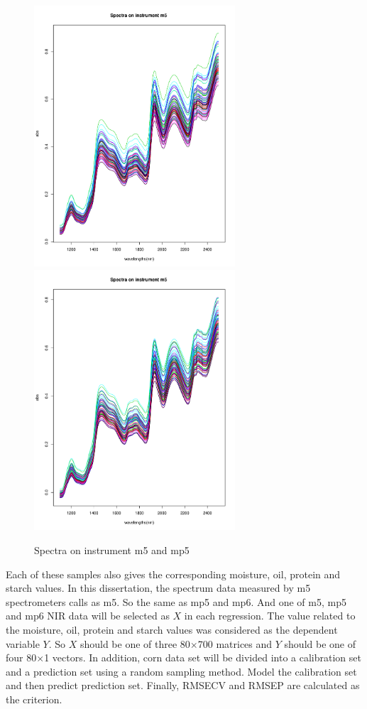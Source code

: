 \documentclass[a4paper,12pt,titlepage]{article} %
\numberwithin{equation}{section}  %
\begin{document}
		\begin{figure}[h]    %
		\centering           %
		\includegraphics[width=7.5cm, angle=0]{Spectra_on_instrument_m5.pdf}  %
				\includegraphics[width=7.5cm, angle=0]{Spectra_on_instrument_mp5.pdf}  %
		\caption{Spectra on instrument m5 and mp5}          %
		\label{fig:Spectra_on_instrument_m5}               %
	\end{figure}                        %
	
	 Each of these samples also gives the corresponding moisture, oil, protein and starch values. In this dissertation, the spectrum data measured by m5 spectrometers calls as m5. So the same as mp5 and mp6. And one of m5, mp5 and mp6 NIR data will be selected as $X$ in each regression. The value related to the moisture, oil, protein and starch values was considered as the dependent variable $Y$. So $X$ should be one of three 80$\times$700 matrices and $Y$ should be one of four 80$\times$1 vectors.
	  In addition, corn data set will be divided into a calibration set and a prediction set using a random sampling method. Model the calibration set and then predict prediction set. Finally, RMSECV and RMSEP are calculated as the criterion.
	
\end{document}
